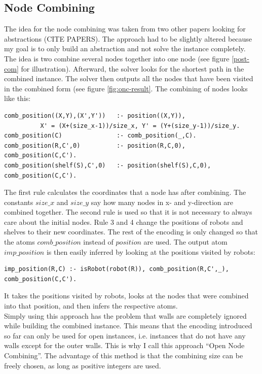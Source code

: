 \documentclass[runningheads]{llncs}
\begin{document}
\subsection{Node Combining}
The idea for the node combining was taken from two other papers looking for abstractions (CITE PAPERS). The approach had to be slightly altered because my goal is to only build an abstraction and not solve the instance completely. The idea is two combine several nodes together into one node (see figure \ref{post-com} for illustration). Afterward, the solver looks for the shortest path in the combined instance. The solver then outputs all the nodes that have been visited in the combined form (see figure \ref{fig:onc-result}. The combining of nodes looks like this:
\begin{verbatim}
comb_position((X,Y),(X',Y'))   :- position((X,Y)),
          X' = (X+(size_x-1))/size_x, Y' = (Y+(size_y-1))/size_y.
comb_position(C)               :- comb_position(_,C).
comb_position(R,C',0)          :- position(R,C,0), comb_position(C,C').
comb_position(shelf(S),C',0)   :- position(shelf(S),C,0), comb_position(C,C').
\end{verbatim}
The first rule calculates the coordinates that a node has after combining. The constants $size\_x$ and $size\_y$ say how many nodes in x- and y-direction are combined together. The second rule is used so that it is not necessary to always care about the initial nodes. Rule 3 and 4 change the positions of robots and shelves to their new coordinates. The rest of the encoding is only changed so that the atoms $comb\_position$ instead of $position$ are used. The output atom $imp\_position$ is then easily inferred by looking at the positions visited by robots:
\begin{verbatim}
imp_position(R,C) :- isRobot(robot(R)), comb_position(R,C',_), comb_position(C,C').
\end{verbatim}
It takes the positions visited by robots, looks at the nodes that were combined into that position, and then infers the respective atoms. \\
Simply using this approach has the problem that walls are completely ignored while building the combined instance. This means that the encoding introduced so far can only be used for open instances, i.e. instances that do not have any walls except for the outer walls. This is why I call this approach ``Open Node Combining''. The advantage of this method is that the combining size can be freely chosen, as long as positive integers are used. \\
\end{document}
